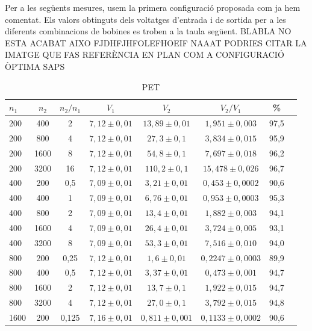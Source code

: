 \documentclass[a4paper,10.5pt]{report}
\begin{document}
Per a les següents mesures, usem la primera configuració proposada com ja hem comentat. Els valors obtinguts dels voltatges d'entrada i de sortida per a les diferents combinacions de bobines es troben a la taula següent. BLABLA NO ESTA ACABAT AIXO FJDHFJHFOLEFHOEIF
NAAAT PODRIES CITAR LA IMATGE QUE FAS REFERÈNCIA EN PLAN COM A CONFIGURACIÓ ÒPTIMA SAPS
\begin{table}[h]
	\centering
	\renewcommand{\arraystretch}{1.2}
	\caption{PET}
	\begin{tabular}{lccccccc}
		\toprule
		$n_1$ & $n_2$ & $n_2/n_1$ & $V_1$ & $V_2$ & $V_2/V_1$ & \%  \\
		\midrule
		200 & 400 & 2 & $7{,}12 \pm 0{,}01$ & $13{,}89 \pm 0{,}01$ & $1{,}951 \pm 0{,}003$ & 97,5 \\
		200 & 800 & 4 & $7{,}12 \pm 0{,}01$ & $27{,}3 \pm 0{,}1$ & $3{,}834 \pm 0{,}015$ & 95,9 \\
		200 & 1600 & 8 & $7{,}12 \pm 0{,}01$ & $54{,}8 \pm 0{,}1$ & $7{,}697 \pm 0{,}018$ & 96,2 \\
		200 & 3200 & 16 & $7{,}12 \pm 0{,}01$ & $110{,}2 \pm 0{,}1$ & $15{,}478 \pm 0{,}026$ & 96,7 \\
		\midrule
		400 & 200 & 0{,}5 & $7{,}09 \pm 0{,}01$ & $3{,}21 \pm 0{,}01$ & $0{,}453 \pm 0{,}0002$ & 90,6 \\
		400 & 400 & 1 & $7{,}09 \pm 0{,}01$ & $6{,}76 \pm 0{,}01$ & $0{,}953 \pm 0{,}0003$ & 95,3 \\
		400 & 800 & 2 & $7{,}09 \pm 0{,}01$ & $13{,}4 \pm 0{,}01$ & $1{,}882 \pm 0{,}003$ & 94,1 \\
		400 & 1600 & 4 & $7{,}09 \pm 0{,}01$ & $26{,}4 \pm 0{,}01$ & $3{,}724 \pm 0{,}005$ & 93,1 \\
		400 & 3200 & 8 & $7{,}09 \pm 0{,}01$ & $53{,}3 \pm 0{,}01$ & $7{,}516 \pm 0{,}010$ & 94,0 \\
		\midrule
		800 & 200 & 0{,}25 & $7{,}12 \pm 0{,}01$ & $1{,}6 \pm 0{,}01$ & $0{,}2247 \pm 0{,}0003$ & 89,9 \\
		800 & 400 & 0{,}5 & $7{,}12 \pm 0{,}01$ & $3{,}37 \pm 0{,}01$ & $0{,}473 \pm 0{,}001$ & 94,7 \\
		800 & 1600 & 2 & $7{,}12 \pm 0{,}01$ & $13{,}7 \pm 0{,}1$ & $1{,}922 \pm 0{,}015$ & 94,7 \\
		800 & 3200 & 4 & $7{,}12 \pm 0{,}01$ & $27{,}0 \pm 0{,}1$ & $3{,}792 \pm 0{,}015$ & 94,8 \\
		\midrule
		1600 & 200 & 0{,}125 & $7{,}16 \pm 0{,}01$ & $0{,}811 \pm 0{,}001$ & $0{,}1133 \pm 0{,}0002$ & 90,6 \\

\end{tabular}
\end{table}
\end{document}

